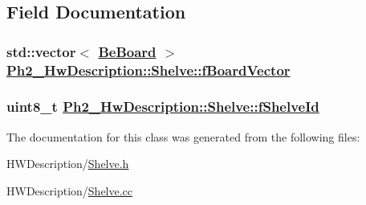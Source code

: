 \subsection{Field Documentation}
\hypertarget{class_ph2___hw_description_1_1_shelve_5b87ee50bb6046acadaeb8226395da52}{
\subsubsection[fBoardVector]{\setlength{\rightskip}{0pt plus 5cm}std::vector$<$ \hyperlink{class_ph2___hw_description_1_1_be_board}{Be\-Board} $>$ \hyperlink{class_ph2___hw_description_1_1_shelve_5b87ee50bb6046acadaeb8226395da52}{Ph2\_\-Hw\-Description::Shelve::f\-Board\-Vector}}}
\label{class_ph2___hw_description_1_1_shelve_5b87ee50bb6046acadaeb8226395da52}


\hypertarget{class_ph2___hw_description_1_1_shelve_d6a771be1946db28ff6418ac419ef543}{
\subsubsection[fShelveId]{\setlength{\rightskip}{0pt plus 5cm}uint8\_\-t \hyperlink{class_ph2___hw_description_1_1_shelve_d6a771be1946db28ff6418ac419ef543}{Ph2\_\-Hw\-Description::Shelve::f\-Shelve\-Id}}}
\label{class_ph2___hw_description_1_1_shelve_d6a771be1946db28ff6418ac419ef543}




The documentation for this class was generated from the following files:\begin{CompactItemize}
\item 
HWDescription/\hyperlink{_shelve_8h}{Shelve.h}\item 
HWDescription/\hyperlink{_shelve_8cc}{Shelve.cc}\end{CompactItemize}
